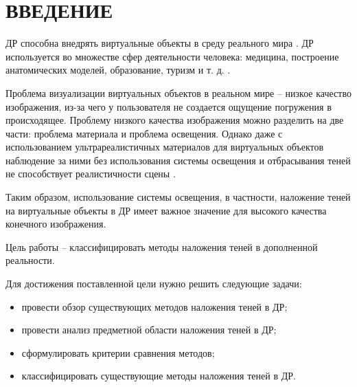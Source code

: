 \chapter*{ВВЕДЕНИЕ}

ДР способна внедрять виртуальные объекты в среду реального мира \cite{rtsm}. ДР используется во множестве сфер деятельности человека: медицина, построение анатомических моделей, образование, туризм и т. д. \cite{tech-ar}.

Проблема визуализации виртуальных объектов в реальном мире -- низкое качество изображения, из-за чего у пользователя не создается ощущение погружения в происходящее. Проблему низкого качества изображения можно разделить на две части: проблема материала и проблема освещения. Однако даже с использованием ультрареалистичных материалов для виртуальных объектов наблюдение за ними без использования системы освещения и отбрасывания теней не способствует реалистичности сцены \cite{rtsm}.

Таким образом, использование системы освещения, в частности, наложение теней на виртуальные объекты в ДР имеет важное значение для высокого качества конечного изображения.

Цель работы -- классифицировать методы наложения теней в дополненной реальности.

Для достижения поставленной цели нужно решить следующие задачи:

\begin{itemize}
	\item провести обзор существующих методов наложения теней в ДР;
	\item провести анализ предметной области наложения теней в ДР;
	\item сформулировать критерии сравнения методов;
	\item классифицировать существующие методы наложения теней в ДР.
\end{itemize}